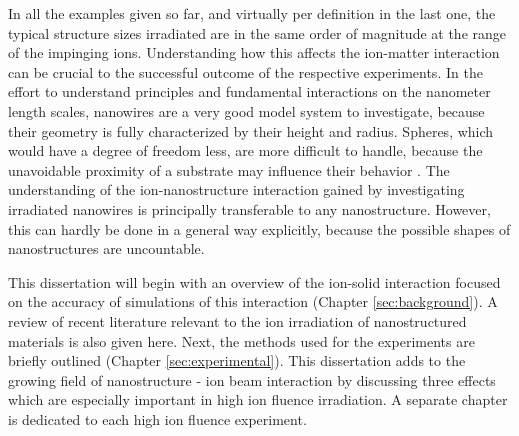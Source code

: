 In all the examples given so far, and virtually per definition in the last one, the typical structure sizes irradiated are in the same order of magnitude at the range of the impinging ions. Understanding how this affects the ion-matter interaction can be crucial to the successful outcome of the respective experiments. In the effort to understand principles and fundamental interactions on the nanometer length scales, nanowires are a very good model system to investigate, because their geometry is fully characterized by their height and radius. Spheres, which would have a degree of freedom less, are more difficult to handle, because the unavoidable proximity of a substrate may influence their behavior \cite{hu_burrowing_2002,klimmer_size-dependent_2009,moller_tri3dyn_2014,johannes_ion_2015}. The understanding of the ion-nanostructure interaction gained by investigating irradiated nanowires is principally transferable to any nanostructure. However, this can hardly be done in a general way explicitly, because the possible shapes of nanostructures are uncountable.

This dissertation will begin with an overview of the ion-solid interaction focused on the accuracy of simulations of this interaction (Chapter \ref{sec:background}). A review of recent literature relevant to the ion irradiation of nanostructured materials is also given here. Next, the methods used for the experiments are briefly outlined (Chapter \ref{sec:experimental}). This dissertation adds to the growing field of nanostructure - ion beam interaction by discussing three effects which are especially important in high ion fluence irradiation. A separate chapter is dedicated to each high ion fluence experiment. 
 
\addtolength{\textheight}{1cm}

